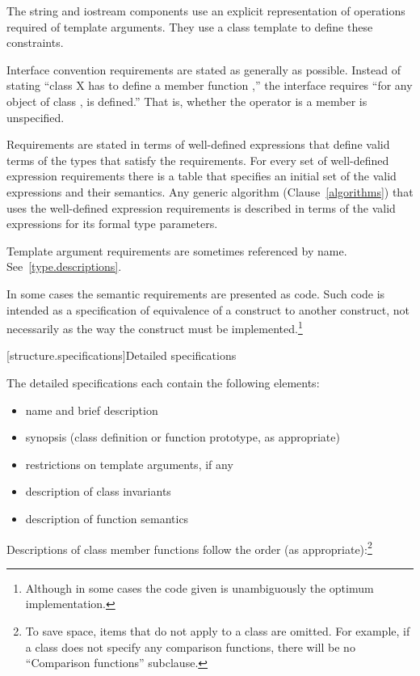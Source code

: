 \pnum
The string and iostream components use an explicit representation of operations
required of template arguments. They use a class template  to
define these constraints.

\pnum
Interface convention requirements are stated as generally as possible. Instead
of stating ``class X has to define a member function ,'' the
interface requires ``for any object  of class ,  is
defined.'' That is, whether the operator is a member is unspecified.

\pnum
Requirements are stated in terms of well-defined expressions that define valid terms of
the types that satisfy the requirements. For every set of well-defined expression
requirements there is a table that specifies an initial set of the valid expressions and
their semantics. Any generic algorithm (Clause~\ref{algorithms}) that uses the
well-defined expression requirements is described in terms of the valid expressions for
its formal type parameters.

\pnum
Template argument requirements are sometimes referenced by name.
See~\ref{type.descriptions}.

\pnum
In some cases the semantic requirements are presented as \Cpp code.
Such code is intended as a
specification of equivalence of a construct to another construct, not
necessarily as the way the construct
must be implemented.\footnote{Although in some cases the code given is
unambiguously the optimum implementation.}

[structure.specifications]{Detailed specifications}

\pnum
The detailed specifications each contain the following elements:%

\begin{itemize}
\item name and brief description
\item synopsis (class definition or function prototype, as appropriate)
\item restrictions on template arguments, if any
\item description of class invariants
\item description of function semantics
\end{itemize}

\pnum
Descriptions of class member functions follow the order (as
appropriate):\footnote{To save space, items that do not apply to a class are omitted.
For example, if a class does not specify any comparison functions, there
will be no ``Comparison functions'' subclause.}

